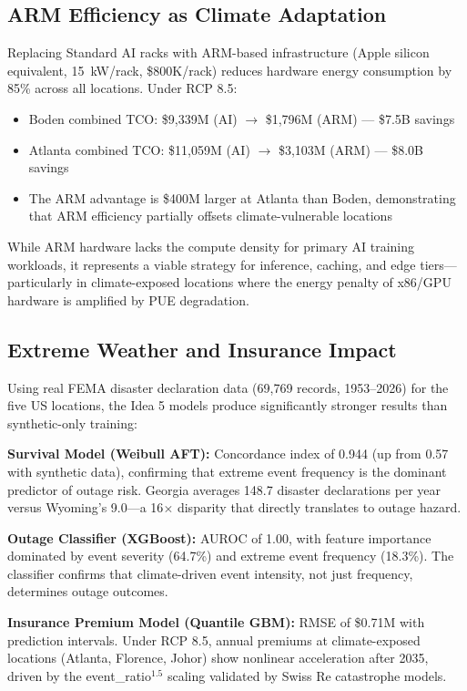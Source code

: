 \documentclass[12pt,a4paper]{article}
\begin{document}
\subsection{ARM Efficiency as Climate Adaptation}

Replacing Standard AI racks with ARM-based infrastructure (Apple silicon equivalent, 15~kW/rack, \$800K/rack) reduces hardware energy consumption by 85\% across all locations. Under RCP 8.5:

\begin{itemize}
    \item Boden combined TCO: \$9,339M (AI) $\rightarrow$ \$1,796M (ARM) — \$7.5B savings
    \item Atlanta combined TCO: \$11,059M (AI) $\rightarrow$ \$3,103M (ARM) — \$8.0B savings
    \item The ARM advantage is \$400M larger at Atlanta than Boden, demonstrating that ARM efficiency partially offsets climate-vulnerable locations
\end{itemize}

While ARM hardware lacks the compute density for primary AI training workloads, it represents a viable strategy for inference, caching, and edge tiers—particularly in climate-exposed locations where the energy penalty of x86/GPU hardware is amplified by PUE degradation.

\subsection{Extreme Weather and Insurance Impact}

Using real FEMA disaster declaration data (69,769 records, 1953--2026) for the five US locations, the Idea 5 models produce significantly stronger results than synthetic-only training:

\textbf{Survival Model (Weibull AFT):} Concordance index of 0.944 (up from 0.57 with synthetic data), confirming that extreme event frequency is the dominant predictor of outage risk. Georgia averages 148.7 disaster declarations per year versus Wyoming's 9.0—a 16$\times$ disparity that directly translates to outage hazard.

\textbf{Outage Classifier (XGBoost):} AUROC of 1.00, with feature importance dominated by event severity (64.7\%) and extreme event frequency (18.3\%). The classifier confirms that climate-driven event intensity, not just frequency, determines outage outcomes.

\textbf{Insurance Premium Model (Quantile GBM):} RMSE of \$0.71M with prediction intervals. Under RCP 8.5, annual premiums at climate-exposed locations (Atlanta, Florence, Johor) show nonlinear acceleration after 2035, driven by the event\_ratio$^{1.5}$ scaling validated by Swiss Re catastrophe models.
\end{document}

